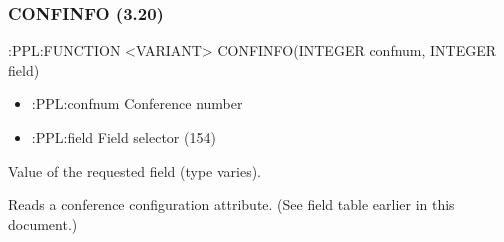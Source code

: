 \documentclass[letterpaper,10pt,english]{sphinxmanual}
\begin{document}
\subsubsection{CONFINFO (3.20)}
\label{\detokenize{ppl:confinfo-3-20}}
\sphinxAtStartPar
:PPL:FUNCTION \textless{}VARIANT\textgreater{} CONFINFO(INTEGER confnum, INTEGER field)
\begin{description}
\begin{itemize}
\item {} 
\sphinxAtStartPar
:PPL:confnum \textendash{} Conference number

\item {} 
\sphinxAtStartPar
:PPL:field \textendash{} Field selector (1\textendash{}54)

\end{itemize}

\sphinxAtStartPar
Value of the requested field (type varies).

\sphinxAtStartPar
Reads a conference configuration attribute. (See field table earlier in this document.)

\end{description}

\sphinxAtStartPar
{}

\begin{sphinxVerbatim}[commandchars=\\\{\}]
     
\end{sphinxVerbatim}
\end{document}

